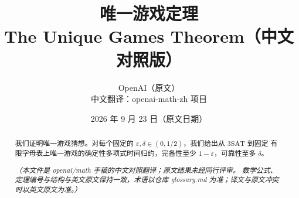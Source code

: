 \documentclass[11pt]{ctexart}
\title{唯一游戏定理\\{\large The Unique Games Theorem（中文对照版）}}
\author{OpenAI（原文）\\中文翻译：openai-math-zh 项目}
\date{2026 年 9 月 23 日（原文日期）}
\theoremstyle{definition}
\theoremstyle{remark}
\numberwithin{equation}{section}
\begin{document}
\maketitle
\begin{abstract}
我们证明唯一游戏猜想。对每个固定的
\(\varepsilon,\delta\in(0,1/2)\)，我们给出从 \(\mathrm{3SAT}\) 到固定
有限字母表上唯一游戏的确定性多项式时间归约，完备性至少
\(1-\varepsilon\)，可靠性至多 \(\delta\)。

\smallskip
\emph{（本文件是 openai/math 手稿的中文对照翻译；原文结果未经同行评审。
数学公式、定理编号与结构与英文原文保持一致，术语以仓库 glossary.md
为准；译文与原文冲突时以英文原文为准。）}
\end{abstract}

\begingroup
\small
\setlength{\baselineskip}{10.5pt}
\setlength{\cftbeforesecskip}{3pt}
\tableofcontents
\endgroup
\clearpage

\FloatBarrier







\appendix



\end{document}
